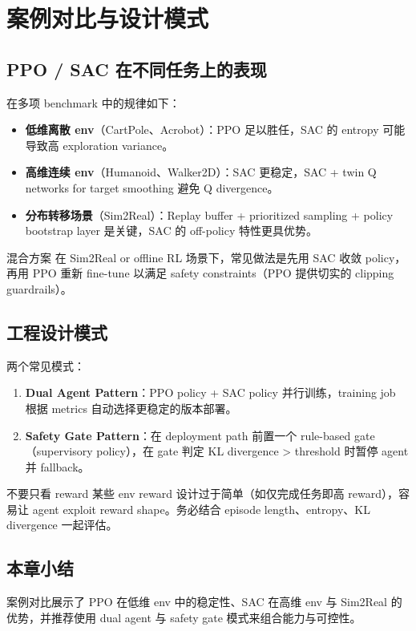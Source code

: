 \section{案例对比与设计模式}

\subsection{PPO / SAC 在不同任务上的表现}

在多项 benchmark 中的规律如下：

\begin{itemize}
    \item \textbf{低维离散 env}（CartPole、Acrobot）：PPO 足以胜任，SAC 的 entropy 可能导致高 exploration variance。
    \item \textbf{高维连续 env}（Humanoid、Walker2D）：SAC 更稳定，SAC + twin Q networks for target smoothing 避免 Q divergence。
    \item \textbf{分布转移场景}（Sim2Real）：Replay buffer + prioritized sampling + policy bootstrap layer 是关键，SAC 的 off-policy 特性更具优势。
\end{itemize}

\begin{importantbox}{混合方案}
在 Sim2Real or offline RL 场景下，常见做法是先用 SAC 收敛 policy，再用 PPO 重新 fine-tune 以满足 safety constraints（PPO 提供切实的 clipping guardrails）。
\end{importantbox}

\subsection{工程设计模式}

两个常见模式：

\begin{enumerate}
    \item \textbf{Dual Agent Pattern}：PPO policy + SAC policy 并行训练，training job 根据 metrics 自动选择更稳定的版本部署。
    \item \textbf{Safety Gate Pattern}：在 deployment path 前置一个 rule-based gate（supervisory policy），在 gate 判定 KL divergence > threshold 时暂停 agent 并 fallback。
\end{enumerate}

\begin{warningbox}{不要只看 reward}
某些 env reward 设计过于简单（如仅完成任务即高 reward），容易让 agent exploit reward shape。务必结合 episode length、entropy、KL divergence 一起评估。
\end{warningbox}

\subsection{本章小结}

案例对比展示了 PPO 在低维 env 中的稳定性、SAC 在高维 env 与 Sim2Real 的优势，并推荐使用 dual agent 与 safety gate 模式来组合能力与可控性。

